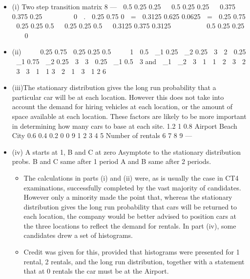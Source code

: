 \documentclass[a4paper,12pt]{article}
\begin{document}
  \begin{itemize}
\item (i) Two step transition matrix
8  — %
 0.5 0.25 0.25   0.5 0.25 0.25   0.375 0.375 0.25 

 
 

0  .  0.25 0.75
0  =  0.3125 0.625 0.0625 
=  0.25 0.75
 0.25 0.25 0.5   0.25 0.25 0.5   0.3125 0.375 0.3125 


 
 
 0.5 0.25 0.25 


0 
\item (ii)     0.25 0.75
 0.25 0.25 0.5 


 1  0.5  \pi_{1} 0.25  \pi_{2} 0.25  3
 2  0.25  \pi_{1} 0.75  \pi_{2} 0.25  3
 3  0.25  \pi_{1} 0.5  3
and  \pi_{1}  \pi_{2}  3  1
 1  2  3
 2  3  3
 1  1
3
 2  1
 3  1
2
6
\item (iii)The stationary distribution gives the long run probability that a particular car
will be at each location. However this does not take into account the demand
for hiring vehicles at each location, or the amount of space available at each
location. These factors are likely to be more important in determining how
many cars to base at each site.
1.2
1
0.8
Airport
Beach
City
0.6
0.4
0.2
0
0
9
1
2
3
4
5
Number of rentals
6
7
8
9  — %
\item (iv) A starts at 1, B and C at zero
Asymptote to the stationary distribution probs.
B and C same after 1 period
A and B same after 2 periods.
\begin{itemize}
\item The calculations in parts (i) and (ii) were, as is usually the case in CT4 examinations,
successfully completed by the vast majority of candidates. However only a minority
made the point that, whereas the stationary distribution gives the long run probability
that cars will be returned to each location, the company would be better advised to
position cars at the three locations to reflect the demand for rentals. In part (iv), some
candidates drew a set of histograms. 
\item Credit was given for this, provided that
histograms were presented for 1 rental, 2 rentals, and the long run distribution,
together with a statement that at 0 rentals the car must be at the Airport.
\end{itemize}
\end{itemize}
    
\end{document}
